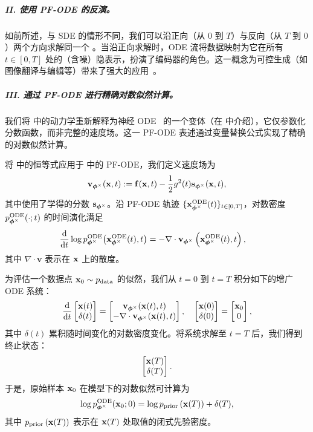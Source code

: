 \subparagraph{II. 使用 PF-ODE 的反演。}如前所述，与 SDE 的情形不同，我们可以沿正向（从 $0$ 到 $T$）与反向（从 $T$ 到 $0$）两个方向求解同一个 。当沿正向求解时，ODE 流将数据映射为它在所有 $t \in [0,T]$ 处的（含噪）隐表示，扮演了编码器的角色。这一概念为可控生成（如图像翻译与编辑等）带来了强大的应用~\citep{mokady2023null,su2022dual}。

\subparagraph{III. 通过 PF-ODE 进行精确对数似然计算。}
我们将  中的动力学重新解释为神经 ODE~\citep{chen2018neural} 的一个变体（在  中介绍），它仅参数化分数函数，而非完整的速度场。这一 PF-ODE 表述通过变量替换公式实现了精确的对数似然计算。

将  中的恒等式应用于  中的 PF-ODE，我们定义速度场为
\[
{\mathbf{v}}_{{\bm{\phi}^\times}}({\mathbf{x}}, t) := {\mathbf{f}}({\mathbf{x}}, t) - \frac{1}{2}g^2(t){\mathbf{s}}_{\bm{\phi}^\times}({\mathbf{x}}, t),
\]
其中使用了学得的分数 ${\mathbf{s}}_{\bm{\phi}^\times}$。沿 PF-ODE 轨迹 $\{{\mathbf{x}}^{\mathrm{ODE}}_{\bm{\phi}^\times}(t)\}_{t \in [0, T]}$，对数密度 $p^{\textup{ODE}}_{\bm{\phi}^\times}(\cdot; t)$ 的时间演化满足
\begin{align*}
    \frac{\mathop{}\!\mathrm{d}}{\mathop{}\!\mathrm{d} t} \log p^{\textup{ODE}}_{\bm{\phi}^\times}\big({\mathbf{x}}^{\mathrm{ODE}}_{\bm{\phi}^\times}(t), t \big) 
    &= -\nabla \cdot {\mathbf{v}}_{{\bm{\phi}^\times}}\left({\mathbf{x}}^{\mathrm{ODE}}_{\bm{\phi}^\times}(t), t  \right),
\end{align*}
其中 $\nabla \cdot \mathbf{v}$ 表示在 ${\mathbf{x}}$ 上的散度。

为评估一个数据点 ${\mathbf{x}}_0 \sim p_{\mathrm{data}}$ 的似然，我们从 $t=0$ 到 $t=T$ 积分如下的增广 ODE 系统：
\begin{align}\label{eq:score-sde-likelihood}
\frac{\mathop{}\!\mathrm{d}}{\mathop{}\!\mathrm{d} t}
\begin{bmatrix}
\mathbf{x}(t) \\
\delta(t)
\end{bmatrix}
=
\begin{bmatrix}
{\mathbf{v}}_{{\bm{\phi}^\times}}(\mathbf{x}(t), t) \\
-\nabla \cdot {\mathbf{v}}_{{\bm{\phi}^\times}}(\mathbf{x}(t), t)
\end{bmatrix}, \quad
\begin{bmatrix}
\mathbf{x}(0) \\
\delta(0)
\end{bmatrix}
=
\begin{bmatrix}
\mathbf{x}_0 \\
0
\end{bmatrix},
\end{align}
其中 $\delta(t)$ 累积随时间变化的对数密度变化。将系统求解至 $t = T$ 后，我们得到终止状态：
\[
\begin{bmatrix}
{\mathbf{x}}(T) \\
\delta(T)
\end{bmatrix}.
\]
于是，原始样本 ${\mathbf{x}}_0$ 在模型下的对数似然可计算为
\[
\log p^{\textup{ODE}}_{\bm{\phi}^\times}({\mathbf{x}}_0; 0) = \log p_{\mathrm{prior}}\left( {\mathbf{x}}(T) \right) + \delta(T),
\]
其中 $ p_{\mathrm{prior}}\left({\mathbf{x}}(T)\right) $ 表示在 $ {\mathbf{x}}(T) $ 处取值的闭式先验密度。

